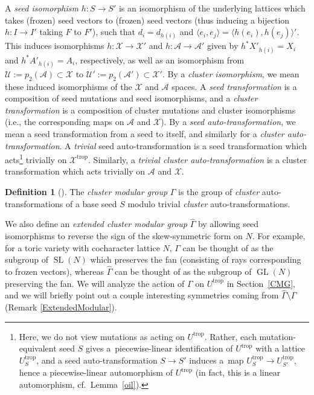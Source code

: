 \documentclass[10pt,a4paper]{amsart}
\numberwithin{equation}{section}
\numberwithin{figure}{section}
\numberwithin{table}{section}
\DeclareMathOperator{\SL}{SL}
\DeclareMathOperator{\GL}{GL}
\DeclareMathOperator{\trop}{trop}
\let\rar=\rightarrow
\let\s=\mathcal
\let\wh=\widehat
\theoremstyle{definition}
\newtheorem{dfn}[thm]{Definition}
\begin{document}
A {\it seed isomorphism} $h\colon S\rar S'$ is an isomorphism of the underlying lattices which takes (frozen) seed vectors to (frozen) seed vectors (thus inducing a bijection $h\colon I\rar I'$ taking $F$ to $F'$), such that $d_i=d_{h(i)}$ and $\langle e_i,e_j\rangle = \langle h(e_i),h(e_j)\rangle'$. This induces isomorphisms $h\colon \s{X}\rar \s{X}'$ and $h\colon \s{A}\rar \s{A}'$ given by
	$h^{*}X'_{h(i)} = X_{i}$ and $h^{*}A'_{h(i)} = A_{i}$, respectively, as well as an isomorphism from $\s{U}:=p_2(\s{A})\subset \s{X}$ to $\s{U}':=p_2(\s{A}') \subset \s{X}'$. By a \textit{cluster isomorphism}, we mean these induced isomorphisms of the $\s{X}$ and $\s{A}$ spaces. A {\it seed transformation} is a composition of seed mutations and seed isomorphisms, and a {\it cluster transformation} is a composition of cluster mutations and cluster isomorphisms (i.e., the corresponding maps on $\s{A}$ and $\s{X}$). By a {\it seed auto-transformation}, we mean a seed transformation from a seed to itself, and similarly for a \textit{cluster auto-transformation}. A {\it trivial} seed auto-transformation is a seed transformation which acts\footnote{Here, we do not view mutations as acting on $U^{\trop}$. Rather, each mutation-equivalent seed $S$ gives a~piecewise-linear identification of $U^{\trop}$ with a lattice $U_S^{\trop}$, and a seed auto-transformation $S\rar S'$ induces a~map \mbox{$U_S^{\trop}\rar U_{S'}^{\trop}$}, hence a piecewise-linear automorphism of $U^{\trop}$ (in fact, this is a linear automorphism, cf.\ Lemma~\ref{oil}).} trivially on $\s{X}^{\trop}$. Similarly, a \textit{trivial cluster auto-transformation} is a cluster transformation which acts trivially on $\s{A}$ and $\s{X}$.
	
\begin{dfn}[\cite{FG1}]The {\it cluster modular group} $\Gamma$ is the group of {\it cluster} auto-transformations of a base seed $S$ modulo trivial {\it cluster} auto-transformations.
\end{dfn}

We also define an {\it extended cluster modular group} $\wh{\Gamma}$ by allowing seed isomorphisms to reverse the sign of the skew-symmetric form on $N$. For example, for a toric variety with cocharacter lattice $N$, $\Gamma$ can be thought of as the subgroup of $\SL(N)$ which preserves the fan (consisting of rays corresponding to frozen vectors), whereas $\wh{\Gamma}$ can be thought of as the subgroup of $\GL(N)$ preserving the fan. We will analyze the action of $\Gamma$ on $U^{\trop}$ in Section~\ref{CMG}, and we will briefly point out a couple interesting symmetries coming from $\wh{\Gamma}\setminus \Gamma$ (Remark \ref{ExtendedModular}).
\end{document}
